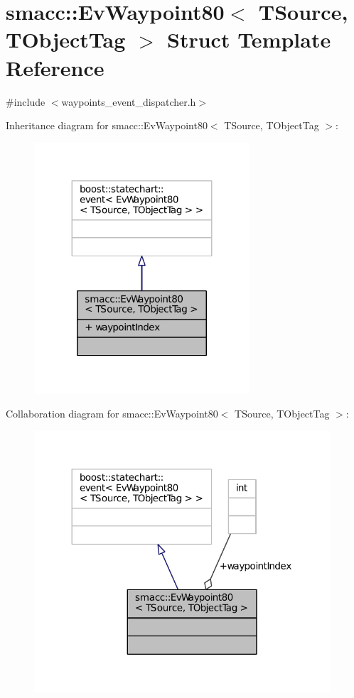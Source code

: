 \hypertarget{structsmacc_1_1EvWaypoint80}{}\section{smacc\+:\+:Ev\+Waypoint80$<$ T\+Source, T\+Object\+Tag $>$ Struct Template Reference}
\label{structsmacc_1_1EvWaypoint80}


{\ttfamily \#include $<$waypoints\+\_\+event\+\_\+dispatcher.\+h$>$}



Inheritance diagram for smacc\+:\+:Ev\+Waypoint80$<$ T\+Source, T\+Object\+Tag $>$\+:
\nopagebreak
\begin{figure}[H]
\begin{center}
\leavevmode
\includegraphics[width=227pt]{structsmacc_1_1EvWaypoint80__inherit__graph}
\end{center}
\end{figure}


Collaboration diagram for smacc\+:\+:Ev\+Waypoint80$<$ T\+Source, T\+Object\+Tag $>$\+:
\nopagebreak
\begin{figure}[H]
\begin{center}
\leavevmode
\includegraphics[width=312pt]{structsmacc_1_1EvWaypoint80__coll__graph}
\end{center}
\end{figure}
